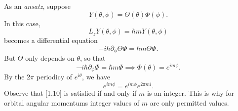 \documentclass[phys334]{subfiles}
\begin{document}
    As an \textit{ansatz}, suppose
    \begin{equation*}
        Y\left( \theta,\phi \right) = \Theta\left( \theta \right)\Phi\left( \phi \right).
    \end{equation*}
    In this case,
    \begin{equation*}
        L_zY\left( \theta,\phi \right) = \hbar mY\left( \theta,\phi \right)
    \end{equation*}
    becomes a differential equation
    \begin{equation*}
        -i\hbar\partial_{\phi} \Theta\Phi = \hbar m\Theta\Phi.
    \end{equation*}
    But $\Theta$ only depends on $\theta$, so that
    \begin{equation*}
        -i\hbar\partial_{\phi}\Phi = \hbar m\Phi \implies \Phi\left( \theta \right) = e^{im\phi}.
    \end{equation*}
    By the $2\pi$ periodicy of $e^{i\theta}$, we have
    \begin{equation}
        e^{im\phi} = e^{im\phi}e^{2\pi mi}.
    \end{equation}
    Observe that [1.10] is satisfied if and only if $m$ is an integer. This is why for orbital angular momentums integer values of $m$ are only permitted values.
\end{document}
